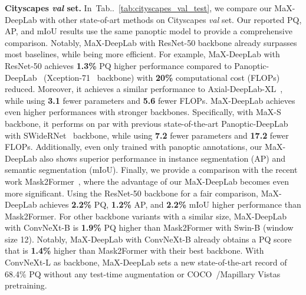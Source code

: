 \documentclass[runningheads]{llncs}
\makeatletter
\DeclareRobustCommand\onedot{\futurelet\@let@token\@onedot}
\def\@onedot{\ifx\@let@token.\else.\null\fi\xspace}
\newcommand{\tabref}[1]{Tab\onedot~\ref{#1}}
\makeatother
\begin{document}
\textbf{Cityscapes \textit{val} set.}\quad
In~\tabref{tab:cityscapes_val_test}, we compare our MaX-DeepLab with other state-of-art methods on Cityscapes \textit{val} set. Our reported PQ, AP, and mIoU results use the same panoptic model to provide a comprehensive comparison.
Notably, MaX-DeepLab with ResNet-50 backbone already surpasses most baselines, while being more efficient.
For example, MaX-DeepLab with ResNet-50 achieves \textbf{1.3\%} PQ higher performance compared to Panoptic-DeepLab~\cite{cheng2019panoptic} (Xception-71~\cite{chollet2016xception} backbone) with \textbf{20\%} computational cost (FLOPs) reduced.
Moreover, it achieves a similar performance to Axial-DeepLab-XL~\cite{wang2020axial}, while using \textbf{3.1} fewer parameters and \textbf{5.6} fewer FLOPs.
MaX-DeepLab achieves even higher performances with stronger backbones.
Specifically, with MaX-S backbone, it performs on par with previous state-of-the-art Panoptic-DeepLab with SWideRNet~\cite{swidernet_2020} backbone, while using \textbf{7.2} fewer parameters and \textbf{17.2} fewer FLOPs.
Additionally, even only trained with panoptic annotations, our MaX-DeepLab also shows superior performance in instance segmentation (AP) and semantic segmentation (mIoU).
Finally, we provide a comparison with the recent work Mask2Former~\cite{cheng2021masked}, where the advantage of our MaX-DeepLab becomes even more significant.
Using the ResNet-50 backbone for a fair comparison, MaX-DeepLab achieves \textbf{2.2\%} PQ, \textbf{1.2\%} AP, and \textbf{2.2\%} mIoU higher performance than Mask2Former.
For other backbone variants with a similar  size, MaX-DeepLab with ConvNeXt-B is \textbf{1.9\%} PQ higher than Mask2Former with Swin-B (window size 12). Notably, MaX-DeepLab with ConvNeXt-B already obtains a PQ score that is \textbf{1.4\%} higher than Mask2Former with their best backbone. With ConvNeXt-L as backbone, MaX-DeepLab sets a new state-of-the-art record of 68.4\% PQ without any test-time augmentation or COCO~\cite{lin2014microsoft}/Mapillary Vistas~\cite{neuhold2017mapillary} pretraining.
\end{document}

